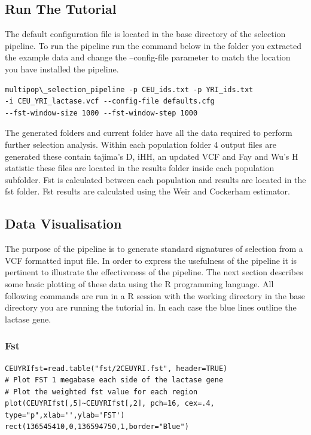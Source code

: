 \documentclass[a4paper,10pt]{article}
\begin{document}
\subsection{Run The Tutorial}
The default configuration file is located in the base directory of the selection pipeline. To run the pipeline run the command below in the folder you extracted the example data and change the --config-file parameter to match the location you have installed the pipeline.\\
\begin{verbatim}
multipop\_selection_pipeline -p CEU_ids.txt -p YRI_ids.txt 
-i CEU_YRI_lactase.vcf --config-file defaults.cfg
--fst-window-size 1000 --fst-window-step 1000
\end{verbatim}
The generated folders and current folder have all the data required to perform further selection analysis. Within each population folder 4 output files are generated these contain tajima's D, iHH, an updated VCF and Fay and Wu's H statistic these files are located in the results folder inside each population subfolder. Fst is calculated between each population and results are located in the fst folder. Fst results are calculated using the Weir and Cockerham estimator.
\subsection{Data Visualisation}
The purpose of the pipeline is to generate standard signatures of selection from a VCF formatted input file. In order to express the usefulness of the pipeline it is pertinent to illustrate the effectiveness of the pipeline. The next section describes some basic plotting of these data using the R programming language. All following commands are run in a R session with the working directory in the base directory you are running the tutorial in. In each case the blue lines outline the lactase gene.
\subsubsection{Fst}


\begin{verbatim}
CEUYRIfst=read.table("fst/2CEUYRI.fst", header=TRUE)
# Plot FST 1 megabase each side of the lactase gene
# Plot the weighted fst value for each region
plot(CEUYRIfst[,5]~CEUYRIfst[,2], pch=16, cex=.4, type="p",xlab='',ylab='FST') 
rect(136545410,0,136594750,1,border="Blue") 
\end{verbatim}
\end{document}
